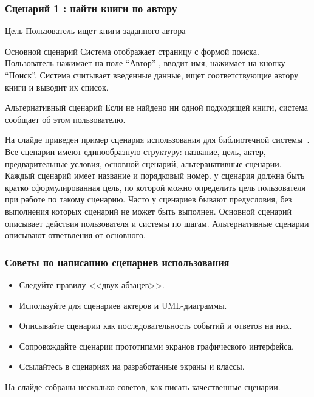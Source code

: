 \documentclass{../industrial-development}
\begin{document}
\begin{frame} \frametitle{Сценарий 1 : найти книги по автору}
  \begin{block}{Цель}
   Пользователь ищет книги заданного автора
  \end{block}
  \begin{block}{Основной сценарий}
   Система отображает страницу с формой поиска. Пользователь нажимает на поле ``Автор'' , вводит имя, нажимает на кнопку ``Поиск''. Система считывает введенные данные, ищет соответствующие автору книги и выводит их список.
  \end{block}
  \begin{block}{Альтернативный сценарий}
    Если не найдено ни одной подходящей книги, система сообщает об этом пользователю.
  \end{block}
\end{frame}

\lecturenotes

На слайде приведен пример сценария использования для библиотечной системы~\cite[143]{Rosenberg}. Все сценарии имеют единообразную структуру: название, цель, актер, предварительные условия, основной сценарий, альтеранативные сценарии. Каждый сценарий имеет название и порядковый номер. у сценария должна быть кратко сформулированная цель, по которой можно определить цель пользователя при работе по такому сценарию. Часто у сценариев бывают предусловия, без выполнения которых сценарий не может быть выполнен. Основной сценарий описывает действия пользователя и системы по шагам. Альтернативные сценарии описывают ответвления от основного.

\begin{frame} \frametitle{Советы по написанию сценариев использования}
 \begin{itemize}
  \item Следуйте правилу <<двух абзацев>>.
  \item Используйте для сценариев актеров и UML-диаграммы.
  \item Описывайте сценарии как последовательность событий и ответов на них.
  \item Сопровождайте сценарии прототипами экранов графического интерфейса.
  \item Ссылайтесь в сценариях на разработанные экраны и классы.
 \end{itemize}
\end{frame}

\lecturenotes

На слайде собраны несколько советов, как писать качественные сценарии.
\end{document}
